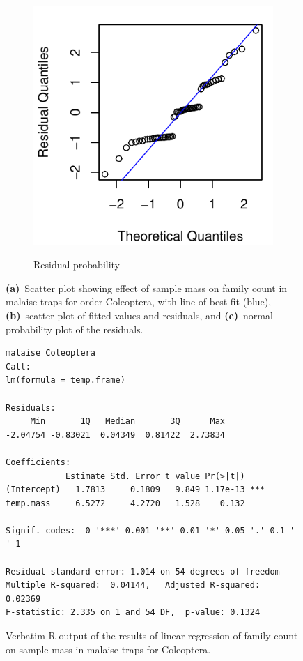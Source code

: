 \documentclass[10pt,letterpaper,twocolumn]{article}
\begin{document}
\begin{figure}[h]
\begin{subfigure}[b]{0.15\textwidth}
		\label{fig:malaise_coleoptera_resid}
	\end{subfigure}
	~
	\begin{subfigure}[b]{0.15\textwidth}
		\caption{Residual probability}
		\includegraphics[width=\textwidth]{plots/mass-vs-count/qqplot/2015_malaise_Coleoptera_qqplot.pdf}
		\label{fig:malaise_coleoptera_qqplot}
	\end{subfigure}
	\caption{\textbf{(a)}~Scatter plot showing effect of sample mass on family count in malaise traps for order Coleoptera, with line of best fit (blue), \textbf{(b)}~scatter plot of fitted values and residuals, and \textbf{(c)}~normal probability plot of the residuals.}
	\label{fig:malaise_coleoptera}
	\smallskip
	\nointerlineskip
	\hrulefill
\end{figure}

\begin{figure}[h]
	\lstset{numbers=left}
	\lstset{xleftmargin=5mm,framexleftmargin=5mm}
	\begin{lstlisting}
malaise Coleoptera
Call:
lm(formula = temp.frame)

Residuals:
     Min       1Q   Median       3Q      Max 
-2.04754 -0.83021  0.04349  0.81422  2.73834 

Coefficients:
            Estimate Std. Error t value Pr(>|t|)    
(Intercept)   1.7813     0.1809   9.849 1.17e-13 ***
temp.mass     6.5272     4.2720   1.528    0.132    
---
Signif. codes:  0 '***' 0.001 '**' 0.01 '*' 0.05 '.' 0.1 ' ' 1

Residual standard error: 1.014 on 54 degrees of freedom
Multiple R-squared:  0.04144,	Adjusted R-squared:  0.02369 
F-statistic: 2.335 on 1 and 54 DF,  p-value: 0.1324
	\end{lstlisting}
	\caption{Verbatim R output of the results of linear regression of family count on sample mass in malaise traps for Coleoptera.}
	\label{fig:malaise_coleoptera_regression}
	\smallskip
	\nointerlineskip
	\hrulefill
\end{figure}
\end{document}
